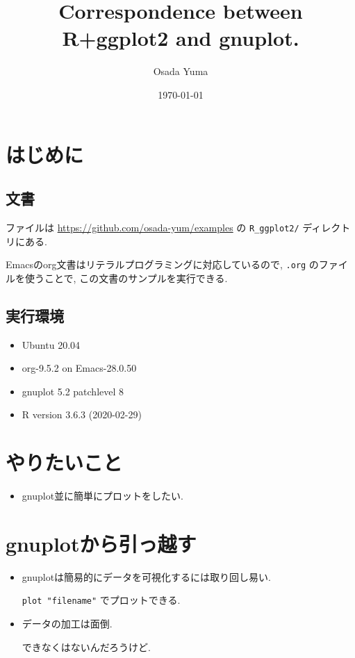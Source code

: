 \documentclass[lualatex,a4paper,12pt,report,ja=standard]{bxjsarticle}
\author{Osada Yuma}
\date{\today}
\title{Correspondence between R+ggplot2 and gnuplot.}
\begin{document}
\maketitle
\tableofcontents

\section{はじめに}
\label{sec:org438c284}
\subsection{文書}
\label{sec:org71a2bfd}
ファイルは
\url{https://github.com/osada-yum/examples} の \texttt{R\_ggplot2/} ディレクトリにある.

Emacsのorg文書はリテラルプログラミングに対応しているので, \texttt{.org} のファイルを使うことで, この文書のサンプルを実行できる.
\subsection{実行環境}
\label{sec:orgfdaa358}
\begin{itemize}
\item Ubuntu 20.04
\item org-9.5.2 on Emacs-28.0.50
\item gnuplot 5.2 patchlevel 8
\item R version 3.6.3 (2020-02-29)
\end{itemize}
\section{やりたいこと}
\label{sec:orge2443ca}
\begin{itemize}
\item gnuplot並に簡単にプロットをしたい.
\end{itemize}
\section{gnuplotから引っ越す}
\label{sec:orgac2ba72}
\begin{itemize}
\item gnuplotは簡易的にデータを可視化するには取り回し易い.

\texttt{plot "filename"} でプロットできる.
\item データの加工は面倒.

できなくはないんだろうけど.
\end{itemize}
\end{document}
